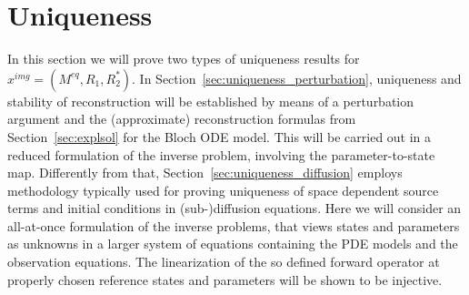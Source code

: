 \documentclass{ws-m3as}
\newcommand{\revisionown}[1]{{ #1}}
\begin{document}
\section{Uniqueness}\label{sec:uniqueness}
In this section we will prove two types of uniqueness results for $x^{img}=(M^{eq},R_1,R_2^*)$.
In Section~\ref{sec:uniqueness_perturbation}, uniqueness and stability of reconstruction  \revisionown{will be established by means of a perturbation argument and the (approximate) reconstruction formulas from Section~\ref{sec:explsol} for the Bloch ODE model.} This will be carried out in a reduced formulation of the inverse problem, involving the parameter-to-state map.
Differently from that, Section~\ref{sec:uniqueness_diffusion} employs methodology typically used for proving uniqueness of space dependent source terms and initial conditions in (sub-)diffusion equations. Here we will consider an all-at-once formulation of the inverse problems, that views states and parameters as unknowns in a larger system of equations containing the PDE models and the observation equations. 
The linearization of the so defined forward operator at properly chosen reference states and parameters will be shown to be injective.
 
\end{document}
